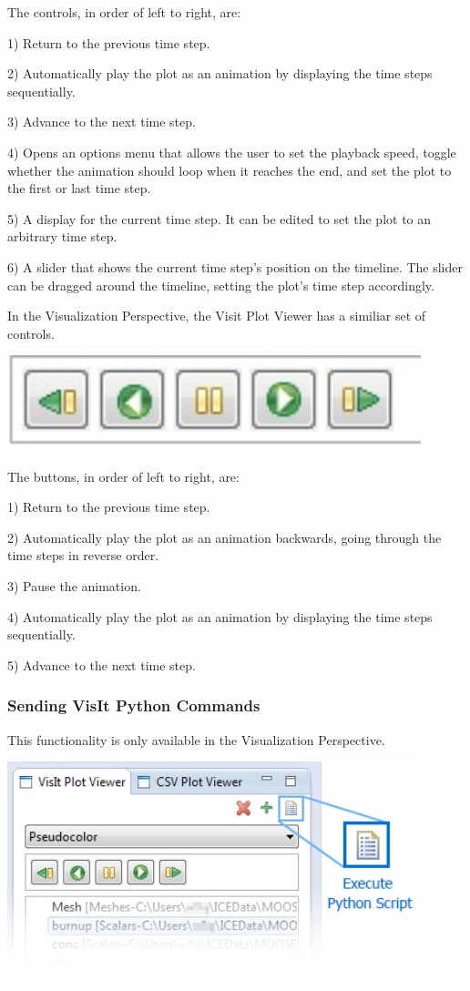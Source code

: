 The controls, in order of left to right, are:

1) Return to the previous time step.

2) Automatically play the plot as an animation by displaying the time steps
sequentially. 

3) Advance to the next time step. 

4) Opens an options menu that allows the user to set the playback speed, toggle
whether the animation should loop when it reaches the end, and set the plot to
the first or last time step.

5) A display for the current time step. It can be edited to set the plot to an
arbitrary time step. 

6) A slider that shows the current time step's position on the timeline. The
slider can be dragged around the timeline, setting the plot's time step
accordingly.

In the Visualization Perspective, the Visit Plot Viewer has a similiar set of
controls.

\begin{center}
\includegraphics[width=12cm]{images/VizPerspectiveTimeControls}
\end{center}

The buttons, in order of left to right, are:

1) Return to the previous time step.

2) Automatically play the plot as an animation backwards, going through the time
steps in reverse order.

3) Pause the animation.

4) Automatically play the plot as an animation by displaying the time steps
sequentially.

5) Advance to the next time step. 

\subsubsection{Sending VisIt Python Commands}

This functionality is only available in the Visualization Perspective.

\begin{center}
\includegraphics[width=12cm]{images/PythonScriptButton}
\end{center}

